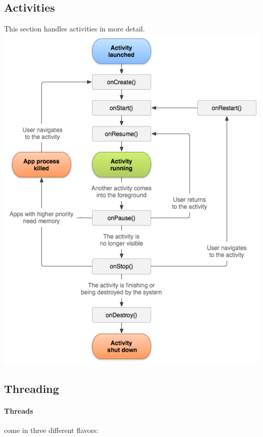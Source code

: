 \subsection{Activities}
This section handles activities in more detail. 
\includegraphics[scale=0.4]{images/activity_lifecycle.png}





\subsection{Threading}

\paragraph{Threads} come in three different flavors:


